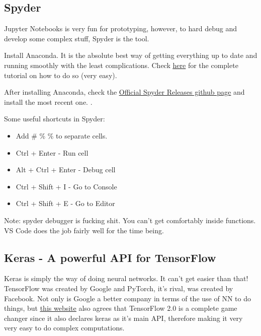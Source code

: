 \subsection{Spyder}

Jupyter Notebooks is very fun for prototyping, however, to hard debug and develop some complex stuff, Spyder is the tool.

Install Anaconda. It is the absolute best way of getting everything up to date and running smoothly with the least complications. Check \href{https://linuxize.com/post/how-to-install-anaconda-on-ubuntu-18-04/}{\ul{here}} for the complete tutorial on how to do so (very easy).

After installing Anaconda, check the \href{https://github.com/spyder-ide/spyder/releases}{\ul{Official Spyder Releases github page}} and install the most recent one. .




Some useful shortcuts in Spyder:
\begin{itemize}
    \item Add \# \% \% to separate cells.
    \item Ctrl + Enter - Run cell
    \item Alt + Ctrl + Enter - Debug cell
    \item Ctrl + Shift + I - Go to Console
    \item Ctrl + Shift + E - Go to Editor
\end{itemize}

Note: spyder debugger is fucking shit. You can't get comfortably inside functions. VS Code does the job fairly well for the time being.


\subsection{Keras - A powerful API for TensorFlow}

Keras is simply the way of doing neural networks. It can't get easier than that!
TensorFlow was created by Google and PyTorch, it's rival, was created by Facebook. Not only is Google a better company in terms of the use of NN to do things, but 
\href{https://towardsdatascience.com/tensorflow-vs-pytorch-vs-keras-for-nlp-exxact-8e51dd13c3f5}{\ul{this website}} also agrees that TensorFlow 2.0 is a complete game changer since it also declares keras as it's main API, therefore making it very very easy to do complex computations.

